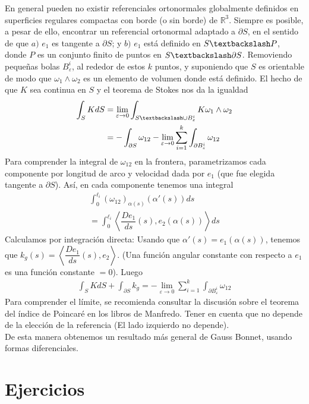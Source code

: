 \documentclass[oneside,11pt]{memoir}
\begin{document}
En general pueden no existir referenciales ortonormales globalmente definidos en superficies regulares compactas con borde (o sin borde) de $\mathbb{R}^3$. Siempre es posible, a pesar de ello, encontrar un referencial ortonormal adaptado a $\partial S$, en el sentido de que $a)$ $e_1$ es tangente a $\partial S$; y $b)$ $e_1$ está definido en $S\textbackslash P$, donde $P$ es un conjunto finito de puntos en $S \textbackslash \partial S$. Removiendo pequeñas bolas $B_\varepsilon^i$, al rededor de estos $k$ puntos, y suponiendo que $S$ es orientable de modo que $\omega_1\land \omega_2$ es un elemento de volumen donde está definido. El hecho de que $K$ sea continua en $S$ y el teorema de Stokes nos da la igualdad
\begin{align*}
    \int_S K dS&=\lim_{\varepsilon\to 0} \int_{S\textbackslash \cup B^i_\varepsilon} K \omega_1\land \omega_2\\
    &=-\int_{\partial S}\omega_{12}-\lim_{\varepsilon\to 0}\sum_{i=1}^k\int_{\partial B^i_\varepsilon}\omega_{12}
\end{align*}
Para comprender la integral de $\omega_{12}$ en la frontera, parametrizamos cada componente por longitud de arco y velocidad dada por $e_1$ (que fue elegida tangente a $\partial S$). Así, en cada componente tenemos una integral
\begin{align*}
    \int_0^{\ell_i}(\omega_{12})_{\alpha(s)}(\alpha'(s))ds\\
    =\int_0^{\ell_i}\left\langle\dfrac{D e_1}{ds}(s), e_2(\alpha(s))\right\rangle ds
\end{align*}
Calculamos por integración directa: Usando que $\alpha'(s)=e_1(\alpha(s))$, tenemos que $k_g(s)=\left\langle\dfrac{D e_1}{ds}(s), e_2\right\rangle$. (Una función angular constante con respecto a $e_1$ es una función constante $=0$). Luego
\begin{align*}
    \int_S K dS+\int_{\partial S} k_g= -\lim_{\varepsilon\to 0}\sum_{i=1}^k\int_{\partial B^i_\varepsilon}\omega_{12}
\end{align*}
Para comprender el límite, se recomienda consultar la discusión sobre el teorema del índice de Poincaré en los libros de Manfredo. Tener en cuenta que no depende de la elección de la referencia (El lado izquierdo no depende).\\

De esta manera obtenemos un resultado más general de Gauss Bonnet, usando formas diferenciales.
\section{Ejercicios}
\end{document}

